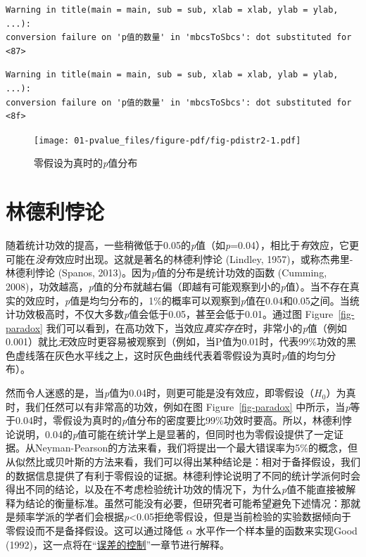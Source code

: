 \documentclass[
  letterpaper,
  DIV=11,
  numbers=noendperiod]{scrreprt}
\begin{document}
\begin{verbatim}
Warning in title(main = main, sub = sub, xlab = xlab, ylab = ylab, ...):
conversion failure on 'p值的数量' in 'mbcsToSbcs': dot substituted for <87>
\end{verbatim}

\begin{verbatim}
Warning in title(main = main, sub = sub, xlab = xlab, ylab = ylab, ...):
conversion failure on 'p值的数量' in 'mbcsToSbcs': dot substituted for <8f>
\end{verbatim}

\begin{figure}

{\centering \texttt{[image: 01-pvalue\_files/figure-pdf/fig-pdistr2-1.pdf]}

}

\caption{\label{fig-pdistr2}零假设为真时的\emph{p}值分布}

\end{figure}

\hypertarget{sec-lindley}{%
\section{林德利悖论}\label{sec-lindley}}

随着统计功效的提高，一些稍微低于0.05的\emph{p}值（如\emph{p}=0.04），相比于\emph{有}效应，它更可能在\emph{没有}效应时出现。这就是著名的林德利悖论
(Lindley, 1957)，或称杰弗里-林德利悖论 (Spanos,
2013)。因为\emph{p}值的分布是统计功效的函数 (Cumming,
2008)，功效越高，\emph{p}值的分布就越右偏（即越有可能观察到小的\emph{p}值）。当不存在真实的效应时，\emph{p}值是均匀分布的，1\%的概率可以观察到\emph{p}值在0.04和0.05之间。当统计功效极高时，不仅大多数\emph{p}值会低于0.05，甚至会低于0.01。通过图
Figure~\ref{fig-paradox}
我们可以看到，在高功效下，当效应\emph{真实存在}时，非常小的\emph{p}值（例如0.001）就比\emph{无}效应时更容易被观察到（例如，当P值为0.01时，代表99\%功效的黑色虚线落在灰色水平线之上，这时灰色曲线代表着零假设为真时\emph{p}值的均匀分布）。

然而令人迷惑的是，当\emph{p}值为0.04时，则更可能是没有效应，即零假设（\(H_0\)）为真时，我们任然可以有非常高的功效，例如在图
Figure~\ref{fig-paradox}
中所示，当\emph{p}等于0.04时，零假设为真时的\emph{p}值分布的密度要比99\%功效时要高。所以，林德利悖论说明，0.04的\emph{p}值可能在统计学上是显著的，但同时也为零假设提供了一定证据。从Neyman-Pearson的方法来看，我们将提出一个最大错误率为5\%的概念，但从似然比或贝叶斯的方法来看，我们可以得出某种结论是：相对于备择假设，我们的数据信息提供了有利于零假设的证据。林德利悖论说明了不同的统计学派何时会得出不同的结论，以及在不考虑检验统计功效的情况下，为什么\emph{p}值不能直接被解释为结论的衡量标准。虽然可能没有必要，但研究者可能希望避免下述情况：那就是频率学派的学者们会根据\emph{p}\textless0.05拒绝零假设，但是当前检验的实验数据倾向于零假设而不是备择假设。这可以通过降低
\(\alpha\) 水平作一个样本量的函数来实现Good
(1992)，这一点将在``\protect\hyperlink{errorcontrol}{误差的控制}''一章节进行解释。
\end{document}
